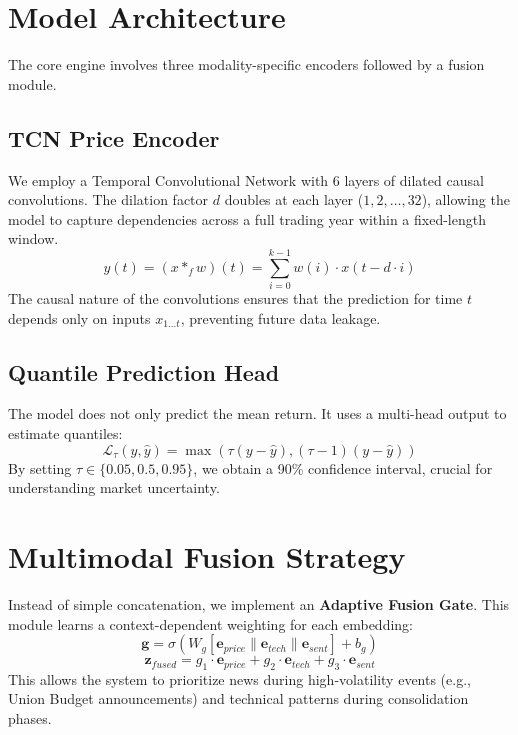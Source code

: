 \documentclass[conference]{IEEEtran}
\begin{document}
\section{Model Architecture}
The core engine involves three modality-specific encoders followed by a fusion module.

\subsection{TCN Price Encoder}
We employ a Temporal Convolutional Network with 6 layers of dilated causal convolutions. The dilation factor $d$ doubles at each layer ($1, 2, \dots, 32$), allowing the model to capture dependencies across a full trading year within a fixed-length window.
\begin{equation}
y(t) = (x * _f w)(t) = \sum_{i=0}^{k-1} w(i) \cdot x(t - d \cdot i)
\end{equation}
The causal nature of the convolutions ensures that the prediction for time $t$ depends only on inputs $x_{1 \dots t}$, preventing future data leakage.

\subsection{Quantile Prediction Head}
The model does not only predict the mean return. It uses a multi-head output to estimate quantiles:
\begin{equation}
\mathcal{L}_{\tau}(y, \hat{y}) = \max(\tau(y - \hat{y}), (\tau - 1)(y - \hat{y}))
\end{equation}
By setting $\tau \in \{0.05, 0.5, 0.95\}$, we obtain a 90\% confidence interval, crucial for understanding market uncertainty.

\section{Multimodal Fusion Strategy}
Instead of simple concatenation, we implement an \textbf{Adaptive Fusion Gate}. This module learns a context-dependent weighting for each embedding:
\begin{equation}
\mathbf{g} = \sigma(W_g [\mathbf{e}_{price} \| \mathbf{e}_{tech} \| \mathbf{e}_{sent}] + b_g)
\end{equation}
\begin{equation}
\mathbf{z}_{fused} = g_1 \cdot \mathbf{e}_{price} + g_2 \cdot \mathbf{e}_{tech} + g_3 \cdot \mathbf{e}_{sent}
\end{equation}
This allows the system to prioritize news during high-volatility events (e.g., Union Budget announcements) and technical patterns during consolidation phases.
\end{document}
